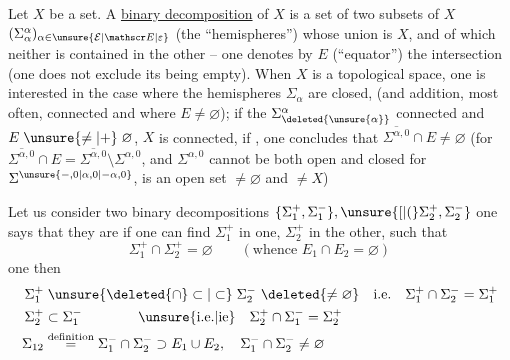Let $X$ be a set. A \uline{binary decomposition} of $X$ is a set of two subsets of $X$ $(\Sigma_{\alpha}^{\alpha})_{\alpha\in\unsure{\mathcal E|\mathscr E|\varepsilon}}$ (the ``hemispheres'') whose union is $X$, and of which  neither is contained in the other -- one denotes by $E$ (``equator'') the intersection (one does not exclude its being empty). When $X$ is a topological space, one is interested in the case where the hemispheres $\Sigma_{\alpha}$ are closed, (and  addition, most often,  connected  and where $E\ne\varnothing$); if the $\Sigma_{\deleted{\unsure{\alpha}}}^{\alpha}$ connected and $E\mathrel{\unsure{\ne|+}}\varnothing$, $X$ is connected, if ,  one concludes  that $\overline{\Sigma^{\alpha,0}}\cap E\ne\varnothing$
\reversemarginpar{}\normalmarginpar
(for $\overline{\Sigma^{\alpha,0}}\cap E=\overline{\Sigma^{\alpha,0}}\setminus\Sigma^{\alpha,0}$, and $\Sigma^{\alpha,0}$ cannot be both open and closed for $\Sigma^{\unsure{-,0|\alpha,0|-\alpha,0}}$, is an open set $\ne\varnothing$ and $\ne X$)

Let us consider two binary decompositions $\{\Sigma_1^{+},\Sigma_1^{-}\},\unsure{[|(}\Sigma_2^{+},\Sigma_2^{-}\}$   one says that they are \uline{} if  one can find $\Sigma_1^{+}$ in one, $\Sigma_2^{+}$ in the other, such that
\[
\Sigma_1^{+}\cap\Sigma_2^{+}=\varnothing\qquad(\text{whence }E_1\cap E_2=\varnothing)
\]
one  then
\[
\begin{aligned}
\Sigma_1^{+}&\mathrel{\unsure{\deleted{\cap}\subset|\subset}}\Sigma_2^{-}\ \deleted{\ne\varnothing}\quad\text{i.e.}\quad\Sigma_1^{+}\cap\Sigma_2^{-}=\Sigma_1^{+}\\
\Sigma_2^{+}&\subset\Sigma_1^{-}\qquad\qquad\text{\unsure{i.e.|ie}}\quad\Sigma_2^{+}\cap\Sigma_1^{-}=\Sigma_2^{+}\\
\Sigma_{12}&\overset{\text{definition}}{=}\Sigma_1^{-}\cap\Sigma_2^{-}\supset E_1\cup E_2,\quad\Sigma_1^{-}\cap\Sigma_2^{-}\ne\varnothing
\end{aligned}
\]

